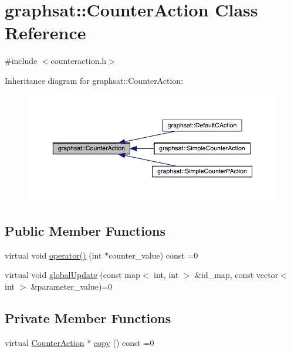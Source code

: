 \hypertarget{classgraphsat_1_1_counter_action}{}\section{graphsat\+::Counter\+Action Class Reference}
\label{classgraphsat_1_1_counter_action}


{\ttfamily \#include $<$counteraction.\+h$>$}



Inheritance diagram for graphsat\+::Counter\+Action\+:\nopagebreak
\begin{figure}[H]
\begin{center}
\leavevmode
\includegraphics[width=350pt]{classgraphsat_1_1_counter_action__inherit__graph}
\end{center}
\end{figure}
\subsection*{Public Member Functions}
\begin{DoxyCompactItemize}
\item 
virtual void \mbox{\hyperlink{classgraphsat_1_1_counter_action_ac21660dc667a4abca69fdda313c6708c}{operator()}} (int $\ast$counter\+\_\+value) const =0
\item 
virtual void \mbox{\hyperlink{classgraphsat_1_1_counter_action_a09e8a5779f0ae70ea07e8974d93edf2e}{global\+Update}} (const map$<$ int, int $>$ \&id\+\_\+map, const vector$<$ int $>$ \&parameter\+\_\+value)=0
\end{DoxyCompactItemize}
\subsection*{Private Member Functions}
\begin{DoxyCompactItemize}
\item 
virtual \mbox{\hyperlink{classgraphsat_1_1_counter_action}{Counter\+Action}} $\ast$ \mbox{\hyperlink{classgraphsat_1_1_counter_action_aa6ab6ebd8e13b466dba062efea962691}{copy}} () const =0
\end{DoxyCompactItemize}
